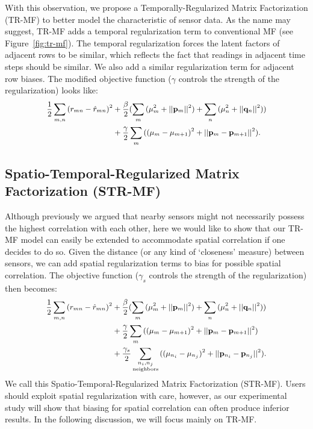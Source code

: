 With this observation, we propose a Temporally-Regularized Matrix Factorization (TR-MF) to better model the characteristic of sensor data. As the name may suggest, TR-MF adds a temporal regularization term to conventional MF (see Figure~\ref{fig:tr-mf}).
The temporal regularization forces the latent factors of adjacent rows to be similar, which reflects the fact that 
readings in adjacent time steps should be similar. We also add a similar regularization term for 
adjacent row biases.
The modified objective function ($\gamma$ controls the strength of the regularization) looks like: 
\begin{equation*}\small \begin{aligned}
\frac{1}{2}\sum_{m,n}{(r_{mn} - \hat{r}_{mn})}^2
&+ \frac{\beta}{2}(\sum_m{(\mu_m^2 + ||\mathbf{p}_m||^2)} + \sum_n{(\mu_n^2 + ||\mathbf{q}_n||^2)}) \\
&+ \frac{\gamma}{2} \sum_m{((\mu_m-\mu_{m+1})^2 + ||\mathbf{p}_m-\mathbf{p}_{m+1}||^2)}.
\end{aligned}\end{equation*}

\subsection{Spatio-Temporal-Regularized Matrix Factorization (STR-MF)}

Although previously we argued that nearby sensors might not necessarily possess the highest correlation with each other, 
here we would like to show that our TR-MF model can easily be extended to accommodate spatial correlation if one decides to do so. 
Given the distance (or any kind of `closeness' measure) between sensors, we can add spatial regularization terms to bias for 
possible spatial correlation.
The objective function ($\gamma_s$ controls the strength of the regularization) then becomes: 
\begin{equation*}\small \begin{aligned}
\frac{1}{2}\sum_{m,n}{(r_{mn} - \hat{r}_{mn})}^2
&+ \frac{\beta}{2}(\sum_m{(\mu_m^2 + ||\mathbf{p}_m||^2)} + \sum_n{(\mu_n^2 + ||\mathbf{q}_n||^2)}) \\
&+ \frac{\gamma}{2} \sum_m{((\mu_m-\mu_{m+1})^2 + ||\mathbf{p}_m-\mathbf{p}_{m+1}||^2)}\\
&+ \frac{\gamma_s}{2} \sum\limits_{\substack{n_i, n_j \\ \text{neighbors}}}{((\mu_{n_i}-\mu_{n_j})^2 + ||\mathbf{p}_{n_i}-\mathbf{p}_{n_j}||^2)}.
\end{aligned}\end{equation*}
We call this Spatio-Temporal-Regularized Matrix Factorization (STR-MF). 
Users should exploit spatial regularization with care, however, as our experimental study will show 
that biasing for spatial correlation can often produce inferior results. 
In the following discussion, we will focus mainly on TR-MF.

